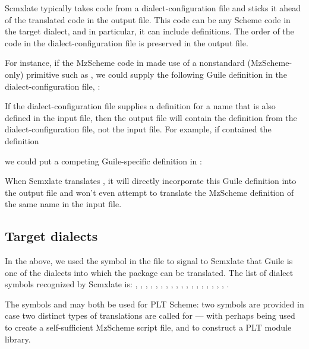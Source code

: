 Scmxlate typically takes code from a
dialect-configuration file and sticks it  ahead of the
translated code in the output file.  This code can be
any Scheme code in the target dialect, and in
particular, it can include definitions.  The order of
the code in the dialect-configuration file is preserved
in the output file.

For instance, if the MzScheme code in  made
use of a nonstandard (MzScheme-only) primitive such as
, we could supply
the following Guile definition in the
dialect-configuration file,
:


If the dialect-configuration file supplies a definition for
a name that is also defined in the input file,
then the output file will contain the definition from
the dialect-configuration file, not the input file.
For example, if  contained
the definition


\n we could put a competing Guile-specific definition
in :


\n When Scmxlate translates , it will directly
incorporate this Guile definition into the output file
 and won't even attempt to translate
the MzScheme definition of the same name in the
input file.

\subsection{Target dialects}

In the above, we used the symbol  in the
 file to signal to
Scmxlate that Guile is one of the dialects into which
the package can be translated.  The list of dialect symbols
recognized by Scmxlate is: , ,
,
, , , , ,
, , , , ,
, , , , ,
.

The symbols  and 
may both be used for PLT Scheme: two symbols are
provided in case two distinct types of translations are
called for --- with  perhaps being used to create a
self-sufficient MzScheme script file, and  to construct a
PLT module library.

